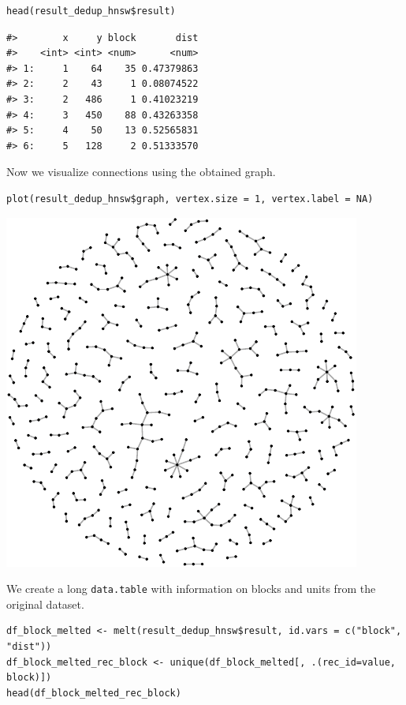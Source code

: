 \begin{verbatim}
head(result_dedup_hnsw$result)
\end{verbatim}

\begin{verbatim}
#>        x     y block       dist
#>    <int> <int> <num>      <num>
#> 1:     1    64    35 0.47379863
#> 2:     2    43     1 0.08074522
#> 3:     2   486     1 0.41023219
#> 4:     3   450    88 0.43263358
#> 5:     4    50    13 0.52565831
#> 6:     5   128     2 0.51333570
\end{verbatim}

Now we visualize connections using the obtained graph.

\begin{verbatim}
plot(result_dedup_hnsw$graph, vertex.size = 1, vertex.label = NA)
\end{verbatim}

\includegraphics{paper-blocking_files/figure-latex/dedup_graph-1.pdf}

We create a long \texttt{data.table} with information on blocks and units from the original dataset.

\begin{verbatim}
df_block_melted <- melt(result_dedup_hnsw$result, id.vars = c("block", "dist"))
df_block_melted_rec_block <- unique(df_block_melted[, .(rec_id=value, block)])
head(df_block_melted_rec_block)
\end{verbatim}

